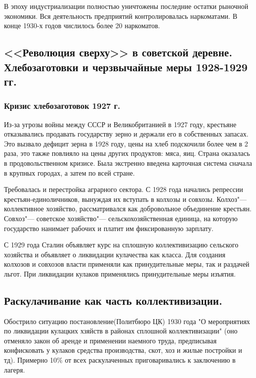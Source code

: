 В эпоху индустриализации полностью уничтожены последние остатки рыночной экономики. Вся деятельность предприятий контролировалась наркоматами. В конце 1930-х годов числилось более 20 наркоматов.


\subsection{<<Революция сверху>> в советской деревне. Хлебозаготовки и черзвычайные меры 1928-1929 гг.}

\subsubsection{Кризис хлебозаготовок 1927 г.}

Из-за угрозы войны между СССР и Великобританией в 1927 году, крестьяне отказывались продавать государству зерно и держали его в собственных запасах. Это вызвало дефицит зерна в 1928 году, цены на хлеб подскочили более чем в 2 раза, это также повлияло на цены других продуктов: мяса, яиц. Страна оказалась в продовольственном кризисе. Была экстренно введена карточная система сначала в крупных городах, а затем по всей стране.

Требовалась и перестройка аграрного сектора. С 1928 года начались репрессии крестьян-единоличников, вынуждая их вступать в колхозы и совхозы. Колхоз"--- коллективное хозяйство, рассматривался как добровольное объединение крестьян. Совхоз"--- советское хозяйство"--- сельскохозяйственная единица, на которую государство нанимает рабочих и платит им фиксированную зарплату.

С 1929 года Сталин объявляет курс на сплошную коллективизацию сельского хозяйства и объявляет о ликвидации кулачества как класса. Для создания колхозов и совхозов власти применяли как принудительные меры, так и раздачей льгот. При ликвидации кулаков применялись принудительные меры изъятия.

\subsection{Раскулачивание как часть коллективизации.}

Обострило ситуацию постановление(Политбюро ЦК) 1930 года "О мероприятиях по ликвидации кулацких хзяйств в районах сплошной коллективизации" (оно отменяло закон об аренде и применении наемного труда, предписывая конфисковать у кулаков средства производства, скот, хоз и жилые постройки и тд). Примерно 10\% от всех раскулаченных приговаривались к заключению в лагеря.

